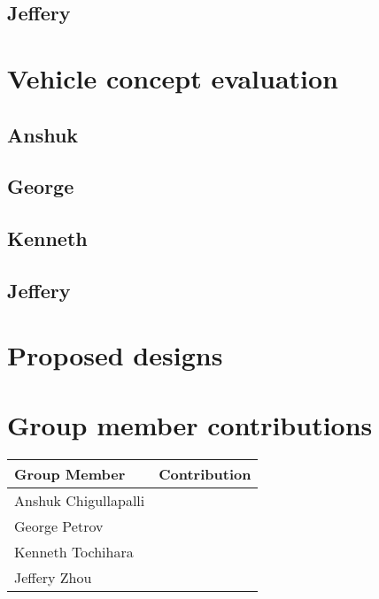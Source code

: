     \subsection{Jeffery}

\section{Vehicle concept evaluation}

    \subsection{Anshuk}
    \subsection{George}
    \subsection{Kenneth}
    \subsection{Jeffery}

\section{Proposed designs}

\section{Group member contributions}

    \begin{table}[H]
        \begin{center}
        \begin{tabular}{ | p{2in} | p{4in}| } 
            \hline
            \textbf{Group Member} & \textbf{Contribution} \\  \hline
            Anshuk Chigullapalli & \\ \hline
            George Petrov & \\ \hline
            Kenneth Tochihara & \\ \hline
            Jeffery Zhou & \\ \hline
        \end{tabular}
        \end{center}
    \end{table}

